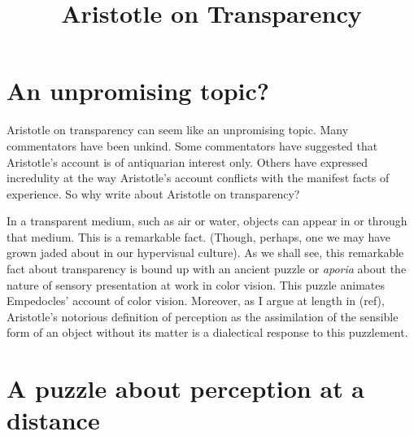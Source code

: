 \documentclass[12pt]{article}
\title{Aristotle on Transparency}
\author{\myauthor}
\date{} %
\begin{document}
\maketitle

\setlength{\parindent}{1em}


\section{An unpromising topic?} %
\label{sec:an_unpromising_topic_}

Aristotle on transparency can seem like an unpromising topic. Many commentators have been unkind. Some commentators have suggested that Aristotle's account is of antiquarian interest only. Others have expressed incredulity at the way Aristotle's account conflicts with the manifest facts of experience. So why write about Aristotle on transparency?

In a transparent medium, such as air or water, objects can appear in or through that medium. This is a remarkable fact. (Though, perhaps, one we may have grown jaded about in our hypervisual culture). As we shall see, this remarkable fact about transparency is bound up with an ancient puzzle or \emph{aporia} about the nature of sensory presentation at work in color vision. This puzzle animates Empedocles' account of color vision. Moreover, as I argue at length in (ref), Aristotle's notorious definition of perception as the assimilation of the sensible form of an object without its matter is a dialectical response to this puzzlement. 


\section{A puzzle about perception at a distance} %
\label{sec:a_puzzle_about_perception_at_a_distance}
\end{document}
